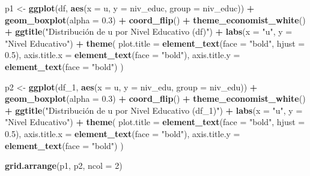 \documentclass[
]{article}
\newenvironment{Shaded}{\begin{snugshade}}{\end{snugshade}}
\newcommand{\AttributeTok}[1]{\textcolor[rgb]{0.13,0.29,0.53}{#1}}
\newcommand{\DecValTok}[1]{\textcolor[rgb]{0.00,0.00,0.81}{#1}}
\newcommand{\FloatTok}[1]{\textcolor[rgb]{0.00,0.00,0.81}{#1}}
\newcommand{\FunctionTok}[1]{\textcolor[rgb]{0.13,0.29,0.53}{\textbf{#1}}}
\newcommand{\NormalTok}[1]{#1}
\newcommand{\OtherTok}[1]{\textcolor[rgb]{0.56,0.35,0.01}{#1}}
\newcommand{\SpecialCharTok}[1]{\textcolor[rgb]{0.81,0.36,0.00}{\textbf{#1}}}
\newcommand{\StringTok}[1]{\textcolor[rgb]{0.31,0.60,0.02}{#1}}
\begin{document}
\begin{Shaded}
\begin{Highlighting}[]
\NormalTok{p1 }\OtherTok{\textless{}{-}} \FunctionTok{ggplot}\NormalTok{(df, }\FunctionTok{aes}\NormalTok{(}\AttributeTok{x =}\NormalTok{ u, }\AttributeTok{y =}\NormalTok{ niv\_educ, }\AttributeTok{group =}\NormalTok{ niv\_educ)) }\SpecialCharTok{+}
  \FunctionTok{geom\_boxplot}\NormalTok{(}\AttributeTok{alpha =} \FloatTok{0.3}\NormalTok{) }\SpecialCharTok{+}  
  \FunctionTok{coord\_flip}\NormalTok{() }\SpecialCharTok{+}
  \FunctionTok{theme\_economist\_white}\NormalTok{() }\SpecialCharTok{+}
  \FunctionTok{ggtitle}\NormalTok{(}\StringTok{"Distribución de u por Nivel Educativo (df)"}\NormalTok{) }\SpecialCharTok{+} 
  \FunctionTok{labs}\NormalTok{(}\AttributeTok{x =} \StringTok{"u"}\NormalTok{, }\AttributeTok{y =} \StringTok{"Nivel Educativo"}\NormalTok{) }\SpecialCharTok{+}
  \FunctionTok{theme}\NormalTok{(}
    \AttributeTok{plot.title =} \FunctionTok{element\_text}\NormalTok{(}\AttributeTok{face =} \StringTok{"bold"}\NormalTok{, }\AttributeTok{hjust =} \FloatTok{0.5}\NormalTok{),}
    \AttributeTok{axis.title.x =} \FunctionTok{element\_text}\NormalTok{(}\AttributeTok{face =} \StringTok{"bold"}\NormalTok{),}
    \AttributeTok{axis.title.y =} \FunctionTok{element\_text}\NormalTok{(}\AttributeTok{face =} \StringTok{"bold"}\NormalTok{)}
\NormalTok{  )}


\NormalTok{p2 }\OtherTok{\textless{}{-}} \FunctionTok{ggplot}\NormalTok{(df\_1, }\FunctionTok{aes}\NormalTok{(}\AttributeTok{x =}\NormalTok{ u, }\AttributeTok{y =}\NormalTok{ niv\_edu, }\AttributeTok{group =}\NormalTok{ niv\_edu)) }\SpecialCharTok{+}
  \FunctionTok{geom\_boxplot}\NormalTok{(}\AttributeTok{alpha =} \FloatTok{0.3}\NormalTok{) }\SpecialCharTok{+}  
  \FunctionTok{coord\_flip}\NormalTok{() }\SpecialCharTok{+}
  \FunctionTok{theme\_economist\_white}\NormalTok{() }\SpecialCharTok{+}
  \FunctionTok{ggtitle}\NormalTok{(}\StringTok{"Distribución de u por Nivel Educativo (df\_1)"}\NormalTok{) }\SpecialCharTok{+} 
  \FunctionTok{labs}\NormalTok{(}\AttributeTok{x =} \StringTok{"u"}\NormalTok{, }\AttributeTok{y =} \StringTok{"Nivel Educativo"}\NormalTok{) }\SpecialCharTok{+}
  \FunctionTok{theme}\NormalTok{(}
    \AttributeTok{plot.title =} \FunctionTok{element\_text}\NormalTok{(}\AttributeTok{face =} \StringTok{"bold"}\NormalTok{, }\AttributeTok{hjust =} \FloatTok{0.5}\NormalTok{),}
    \AttributeTok{axis.title.x =} \FunctionTok{element\_text}\NormalTok{(}\AttributeTok{face =} \StringTok{"bold"}\NormalTok{),}
    \AttributeTok{axis.title.y =} \FunctionTok{element\_text}\NormalTok{(}\AttributeTok{face =} \StringTok{"bold"}\NormalTok{)}
\NormalTok{  )}


\FunctionTok{grid.arrange}\NormalTok{(p1, p2, }\AttributeTok{ncol =} \DecValTok{2}\NormalTok{)}
\end{Highlighting}
\end{Shaded}
\end{document}
